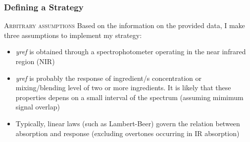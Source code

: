 \begin{frame}
\frametitle{Defining a Strategy}
    \begin{exampleblock}{\textsc{Arbitrary assumptions}}
        Based on the information on the provided data, I make three assumptions to implement my strategy:
        \begin{itemize}
            \item \textit{yref} is obtained through a spectrophotometer operating in the near infrared region (NIR)
            \item \textit{yref} is probably the response of ingredient/s concentration or mixing/blending level of two or more ingredients. It is likely that these properties depens on a small interval of the spectrum (assuming mimimum signal overlap) 
            \item Typically, linear laws (such as Lambert-Beer) govern the relation between absorption and response (excluding overtones occurring in IR absorption)
        \end{itemize}
        \end{exampleblock}
\end{frame}
